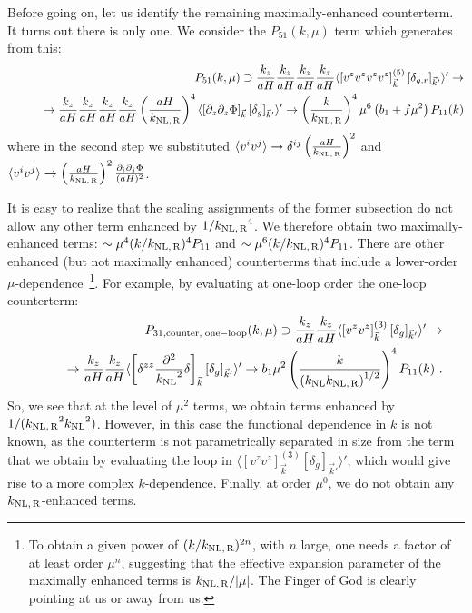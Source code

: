 \documentclass[12pt,a4paper]{article}
\newcommand{\dd}{\partial}
\def\nn{\nonumber}
\renewcommand{\(}{\left(}
\renewcommand{\)}{\right)}
\def\ba{\begin{eqnarray}}
\def\ea{\end{eqnarray}}
\def\knl{{k_{\rm NL}}}
\def\knlr{{k_{\rm NL,\,R}}}
\begin{document}
Before going on, let us identify the remaining maximally-enhanced counterterm. It turns out there is only one.  We consider the $P_{51}(k,\mu)$ term which generates from this:
\ba\label{eq:counter2}
&&P_{51}(k,\mu)\supset \frac{k_z}{aH} \frac{k_z}{aH}\frac{k_z}{aH}\frac{k_z}{aH}\langle\left[v^z v^z v^z v^z \right]^{(5)}_{\vec k} [\delta_{g,r}]_{\vec k'}\rangle'\to\\ \nn
&&\qquad\to \frac{k_z}{aH} \frac{k_z}{aH}\frac{k_z}{aH}\frac{k_z}{aH}\left(\frac{a H}{\knlr}\right)^4 \langle\left[\dd_z \dd_z\Phi \right]_{\vec k} [\delta_g]_{\vec k'}\rangle' \to \left(\frac{k}{\knlr}\right)^4\mu^6 \left(b_1+f \mu^2\right) P_{11}(k)
\ea
where in the second step we substituted $\langle v^i v^j\rangle\to\delta^{ij} \left(\frac{a H}{\knlr}\right)^2$ and $\langle v^i v^j\rangle\to \left(\frac{a H}{\knlr}\right)^2\frac{\dd_i\dd_j \Phi}{(aH)^2}$. 

It is easy to realize that the scaling assignments of the former subsection do not allow any other term enhanced by $1/\knlr^4$. We therefore obtain two maximally-enhanced terms: $\sim\mu^4 (k/\knlr)^4P_{11}$ and $\sim\mu^6 (k/\knlr)^4P_{11}$. There are other enhanced (but not maximally enhanced) counterterms that include a lower-{order} $\mu$-dependence~\footnote{To obtain a given power of $(k/\knlr)^{2n}$, with $n$ large, one needs a factor of at least order $\mu^n$, suggesting that the effective expansion parameter of the maximally enhanced terms is $\knlr/|\mu|$. The Finger of God is clearly pointing at us or away from us.}. For example, by evaluating at one-loop order the one-loop counterterm: 
\ba\label{eq:counter2}
&&P_{31,{\rm counter,\; one-loop}}(k,\mu)\supset \frac{k_z}{aH} \frac{k_z}{aH}\langle\left[v^z v^z \right]^{(3)}_{\vec k} [\delta_g]_{\vec k'}\rangle'\to\\ \nn
&&\qquad \to \frac{k_z}{aH} \frac{k_z}{aH}\langle\left[\delta^{zz}\frac{\dd^2}{\knl^2} \delta \right]_{\vec k} [\delta_g]_{\vec k'}\rangle'\to b_1\mu^2\left(\frac{k}{\left(\knl\knlr\right)^{1/2}}\right)^4P_{11}(k)\ .
\ea
So, we see that at the level of $\mu^2$ terms, we obtain terms enhanced by $1/(\knlr^2\knl^2)$. However, in this case the functional dependence in $k$ is not known, as the counterterm is not parametrically separated in size from the term that we obtain by evaluating the loop in $\langle\left[v^z v^z \right]^{(3)}_{\vec k} [\delta_g]_{\vec k'}\rangle'$, which would give rise to a more complex $k$-dependence.
Finally, at order $\mu^0$, we do not obtain any $\knlr$-enhanced terms.
\end{document}
